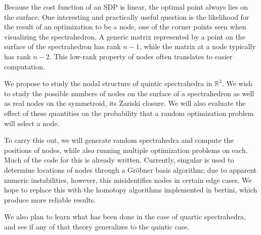 \documentclass[12pt]{amsart}
\begin{document}
Because the cost function of an SDP is linear, the optimal point
always lies on the surface.  One interesting and practically useful
question is the likelihood for the result of an optimization to be a
node, one of the corner points seen when visualizing the
spectrahedron.  A generic matrix represented by a point on the surface
of the spectrahedron has rank $n-1$, while the matrix at a node
typically has rank $n-2$.  This low-rank property of nodes often
translates to easier computation.

We propose to study the nodal structure of quintic spectrahedra in
$\mathbb{R}^3$.  We wish to study the possible numbers of nodes on the
surface of a spectrahedron as well as real nodes on the symmetroid,
its Zariski closure.  We will also evaluate the effect of these
quantities on the probability that a random optimization problem will
select a node.

To carry this out, we will generate random spectrahedra and compute
the positions of nodes, while also running multiple optimization
problems on each.  Much of the code for this is already
written.  Currently, singular is used to determine locations of nodes
through a Gr\"obner basis algorithm; due to apparent numeric
instabilities, however, this misidentifies nodes in certain edge
cases.  We hope to replace this with the homotopy algorithms
implemented in bertini, which produce more reliable results.

We also plan to learn what has been done in the case of quartic spectrahedra,
and see if any of that theory generalizes to the quintic case.




\nocite{*}
\end{document}
